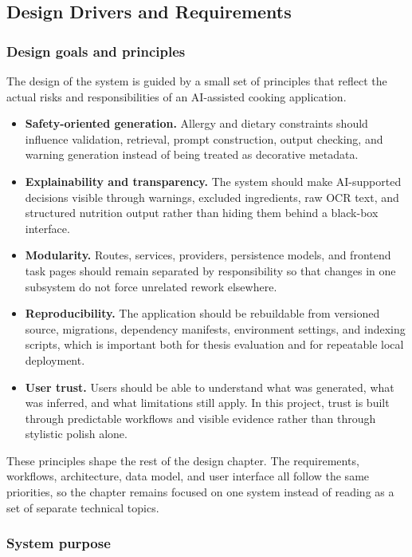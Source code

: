\subsection{Design Drivers and Requirements}

\subsubsection{Design goals and principles}

The design of the system is guided by a small set of principles that
reflect the actual risks and responsibilities of an AI-assisted cooking
application.

\begin{itemize}
	\item \textbf{Safety-oriented generation.} Allergy and dietary
	constraints should influence validation, retrieval, prompt
	construction, output checking, and warning generation instead of being
	treated as decorative metadata.
	\item \textbf{Explainability and transparency.} The system should make
	AI-supported decisions visible through warnings, excluded ingredients,
	raw OCR text, and structured nutrition output rather than hiding them
	behind a black-box interface.
	\item \textbf{Modularity.} Routes, services, providers, persistence
	models, and frontend task pages should remain separated by
	responsibility so that changes in one subsystem do not force unrelated
	rework elsewhere.
	\item \textbf{Reproducibility.} The application should be rebuildable
	from versioned source, migrations, dependency manifests, environment
	settings, and indexing scripts, which is important both for thesis
	evaluation and for repeatable local deployment.
	\item \textbf{User trust.} Users should be able to understand what was
	generated, what was inferred, and what limitations still apply. In
	this project, trust is built through predictable workflows and visible
	evidence rather than through stylistic polish alone.
\end{itemize}

These principles shape the rest of the design chapter. The requirements,
workflows, architecture, data model, and user interface all follow the
same priorities, so the chapter remains focused on one system instead
of reading as a set of separate technical topics.

\subsubsection{System purpose}

